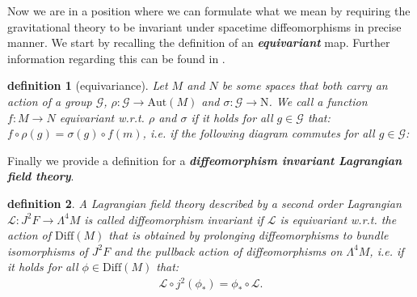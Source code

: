 \documentclass[a4paper,12pt, DIV=14, BCOR=5mm, twoside, headsepline]{scrbook}
\newtheorem{definition}{definition}[section]
\begin{document}
Now we are in a position where we can formulate what we mean by requiring the gravitational theory to be invariant under spacetime diffeomorphisms in precise manner. We start by recalling the definition of an \textit{\textbf{equivariant}} map. Further information regarding this can be found in \cite{doi:10.1142/3867}.
\begin{definition}[equivariance]
Let $M$ and $N$ be some spaces that both carry an action of a group $\mathcal{G}$, $\rho : \mathcal{G} \rightarrow \mathrm{Aut}(M)$ and $\sigma : \mathcal{G} \rightarrow \mathrm{N}$. We call a function $f : M \rightarrow N$ equivariant w.r.t. $\rho$ and $\sigma$ if it holds for all $g \in \mathcal{G}$ that: $f \circ \rho(g) = \sigma(g) \circ f(m)$, i.e. if the following diagram commutes for all $g \in \mathcal{G}$:
\begin{center}
\end{center}
\end{definition}
Finally we provide a definition for a \textit{\textbf{diffeomorphism invariant Lagrangian field theory}}.
\begin{definition}
A Lagrangian field theory described by a second order Lagrangian $\mathcal{L} : J^2F \rightarrow \Lambda^4 M$ is called diffeomorphism invariant if $\mathcal{L}$ is equivariant w.r.t. the action of $\mathrm{Diff}(M)$ that is obtained by prolonging diffeomorphisms to bundle isomorphisms of $J^2F$ and the pullback action of diffeomorphisms on $\Lambda^4M$, i.e. if it holds for all $\phi \in \mathrm{Diff}(M)$ that: 
\begin{align}
     \mathcal{L}\circ j^2(\phi_{\ast}) = \phi_{\ast} \circ \mathcal{L}.
\end{align}
\end{definition}
\end{document}
